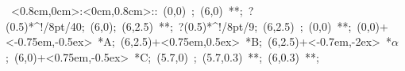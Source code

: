 \hbox{
\xy    <0.8cm,0cm>:<0cm,0.8cm>::
       (0,0) ; (6,0) **\dir{-}; ?(0.5)*^!/8pt/{40};
       (6,0); (6,2.5) **\dir{-}; ?(0.5)*^!/8pt/{9}; 
       (6,2.5) ; (0,0) **\dir{-};  
       (0,0)+<-0.75em,-0.5ex> *{A};
       (6,2.5)+<0.75em,0.5ex> *{B};
       (6,2.5)+<-0.7em,-2ex> *\hbox{$\alpha$};
       (6,0)+<0.75em,-0.5ex> *{C};
       (5.7,0) ; (5.7,0.3) **\dir{-}; (6,0.3) **\dir{-};       
\endxy}
	   
